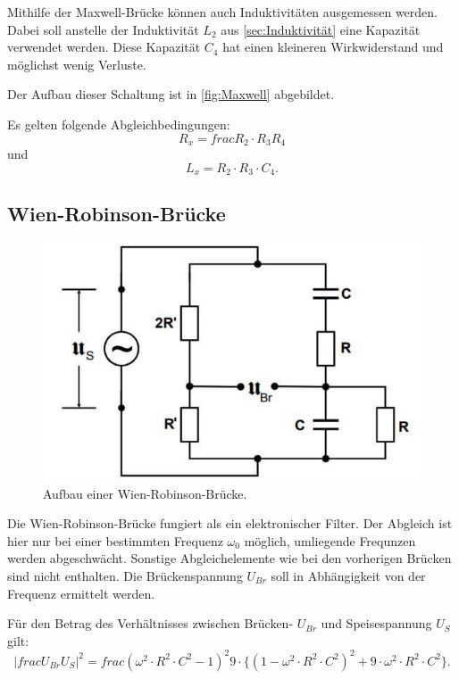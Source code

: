 Mithilfe der Maxwell-Brücke können auch Induktivitäten ausgemessen werden.
Dabei soll anstelle der Induktivität $L_2$ aus \ref{sec:Induktivität} eine Kapazität verwendet werden.
Diese Kapazität $C_4$ hat einen kleineren Wirkwiderstand und möglichst wenig Verluste.

Der Aufbau dieser Schaltung ist in \ref{fig:Maxwell} abgebildet.

Es gelten folgende Abgleichbedingungen:
\begin{equation}
    R_x = frac{R_2 \cdot R_3}{R_4}
\end{equation}
und
\begin{equation}
    L_x = R_2 \cdot R_3 \cdot C_4 .
\end{equation}

\subsection{Wien-Robinson-Brücke}

\begin{figure}
    \centering
    \includegraphics[width=\textwidth]{WienRobinBruecke.pdf}
    \caption{Aufbau einer Wien-Robinson-Brücke. \cite{anleitung}}
\end{figure}

Die Wien-Robinson-Brücke fungiert als ein elektronischer Filter.
Der Abgleich ist hier nur bei einer bestimmten Frequenz $\omega_0$ möglich, umliegende Frequnzen werden abgeschwächt.
Sonstige Abgleichelemente wie bei den vorherigen Brücken sind nicht enthalten.
Die Brückenspannung $U_{Br}$ soll in Abhängigkeit von der Frequenz ermittelt werden.

Für den Betrag des Verhältnisses zwischen Brücken- $U_{Br}$ und Speisespannung $U_S$ gilt:
\begin{equation}
    \label{eq:U_br durch U_s}
    \lvert{frac{U_{Br}}{U_S}}\rvert^2 = frac{(\omega^2 \cdot R^2 \cdot C^2 - 1)^2}{9 \cdot \{(1 - \omega^2 \cdot R^2 \cdot C^2)^2 + 9 \cdot \omega^2 \cdot R^2 \cdot C^2\}} .
\end{equation}

